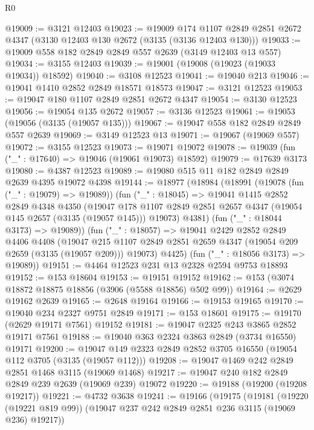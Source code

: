 \begin{lexlean}{R0}
\begin{coremodule}
@19009 := @3121 @12403
@19023 := @19009
    @174
    @1107
    @2849
    @2851
    @2672
    @4347
    (@3130 @12403 @130 @2672 (@3135 (@3136 @12403 @130)))
@19033 := @19009 @558 @182 @2849 @2849 @557 @2639 (@3149 @12403 @13 @557)
@19034 := @3155 @12403
@19039 := @19001 (@19008 (@19023 (@19033 @19034)) @18592)
@19040 := @3108 @12523
@19041 := @19040 @213
@19046 := @19041 @1410 @2852 @2849 @18571 @18573
@19047 := @3121 @12523
@19053 := @19047 @180 @1107 @2849 @2851 @2672 @4347
@19054 := @3130 @12523
@19056 := @19054 @135 @2672
@19057 := @3136 @12523
@19061 := @19053 (@19056 (@3135 (@19057 @135)))
@19067 := @19047 @558 @182 @2849 @2849 @557 @2639
@19069 := @3149 @12523 @13
@19071 := @19067 (@19069 @557)
@19072 := @3155 @12523
@19073 := @19071 @19072
@19078 := @19039 (fun ("_" : @17640) => @19046 (@19061 @19073) @18592)
@19079 := @17639 @3173
@19080 := @4387 @12523
@19089 := @19080 @515 @11 @182 @2849 @2849 @2639 @4395 @19072 @4398
@19144 := @18977
    (@18984
      (@18991
        (@19078 (fun ("_" : @19079) => @19089))
        (fun ("_" : @18045) =>
        @19041
          @1415
          @2852
          @2849
          @4348
          @4350
          (@19047
            @178
            @1107
            @2849
            @2851
            @2657
            @4347
            (@19054 @145 @2657 (@3135 (@19057 @145)))
            @19073)
          @4381)
        (fun ("_" : @18044 @3173) => @19089))
      (fun ("_" : @18057) =>
      @19041
        @2429
        @2852
        @2849
        @4406
        @4408
        (@19047 @215 @1107 @2849 @2851 @2659 @4347 (@19054 @209 @2659 (@3135 (@19057 @209))) @19073)
        @4425)
      (fun ("_" : @18056 @3173) => @19089))
@19151 := @4464 @12523 @231 @13 @2328 @2594 @9753 @18893
@19152 := @153 @18604
@19153 := @19151 @19152
@19162 := @153 (@3074 @18872 @18875 @18856 (@3906 (@5588 @18856) @502 @99))
@19164 := @2629 @19162 @2639
@19165 := @2648 @19164
@19166 := @19153 @19165
@19170 := @19040 @234 @2327 @9751 @2849
@19171 := @153 @18601
@19175 := @19170 (@2629 @19171 @7561) @19152
@19181 := @19047 @2325 @243 @3865 @2852 @19171 @7561
@19188 := @19040 @363 @2324 @3863 @2849 (@3734 @16550) @19171
@19200 := @19047 @149 @2323 @2849 @2852 @3705 @16550 (@19054 @112 @3705 (@3135 (@19057 @112)))
@19208 := @19047 @1469 @242 @2849 @2851 @1468 @3115 (@19069 @1468)
@19217 := @19047 @240 @182 @2849 @2849 @239 @2639 (@19069 @239) @19072
@19220 := @19188 (@19200 (@19208 @19217))
@19221 := @4732 @3638
@19241 := @19166
    (@19175
      (@19181
        (@19220 (@19221 @819 @99))
        (@19047 @237 @242 @2849 @2851 @236 @3115 (@19069 @236) @19217))

\end{coremodule}
\end{lexlean}

